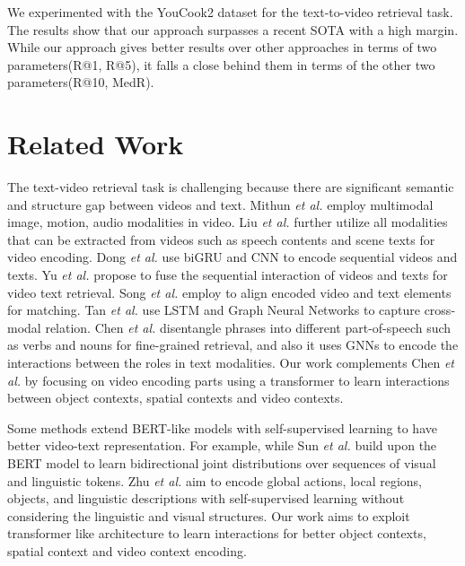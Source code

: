 \documentclass{article}
\begin{document}
We experimented with the YouCook2 dataset for the text-to-video retrieval task. The results show that our approach surpasses a recent SOTA with a high margin. While our approach gives better results over other approaches in terms of two parameters(R@1, R@5), it falls a close behind them in terms of the other two parameters(R@10, MedR). 

\section{Related Work}
\label{sec:relatedwork}

The text-video retrieval task is challenging because there are significant semantic and structure gap between videos and text. Mithun \textit{et al.} \cite{mithun2020} employ multimodal image, motion, audio modalities in video. Liu \textit{et al.} \cite{Liu2019a} further utilize all modalities that can be extracted from videos such as speech contents and scene texts for video encoding. Dong \textit{et al.} \cite{dong_cvpr19} use biGRU and CNN to encode sequential videos and texts. Yu \textit{et al.} \cite{Yu_2018_ECCV} propose to fuse the sequential interaction of videos and texts for video text retrieval. Song \textit{et al.} \cite{song2019polysemous} employ to align encoded video and text elements for matching. Tan \textit{et al.} \cite{tan2020wman} use LSTM and Graph Neural Networks to capture cross-modal relation. Chen \textit{et al.} \cite{Chen_2020_CVPR} disentangle phrases into different part-of-speech such as verbs and nouns for fine-grained retrieval, and also it uses GNNs to encode the interactions between the roles in text modalities. Our work complements Chen \textit{et al.} \cite{Chen_2020_CVPR} by focusing on video encoding parts using a transformer to learn interactions between object contexts, spatial contexts and video contexts. 

Some methods \cite{videobert, Zhu_2020_Actbert} extend BERT-like models with self-supervised learning to have better video-text representation. For example, while Sun \textit{et al.} \cite{videobert} build upon the BERT model to learn bidirectional joint distributions over sequences of visual and linguistic tokens. Zhu \textit{et al.} \cite{Zhu_2020_Actbert} aim to encode global actions, local regions, objects, and linguistic descriptions with self-supervised learning without considering the linguistic and visual structures. Our work aims to exploit transformer like architecture to learn interactions for better object contexts, spatial context and video context encoding. 
\end{document}

